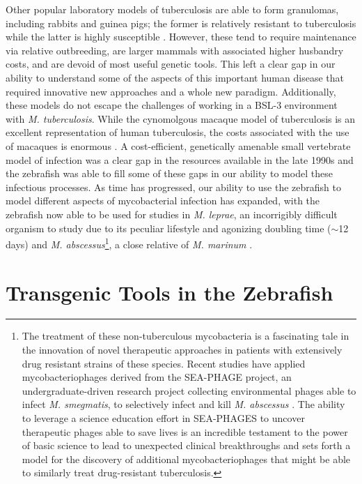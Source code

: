 Other popular laboratory models of tuberculosis are able to form granulomas, including rabbits and guinea pigs; the former is relatively resistant to tuberculosis while the latter is highly susceptible \citep{Heppleston1949, Dorman2004, Clark2014}. However, these tend to require maintenance via relative outbreeding, are larger mammals with associated higher husbandry costs, and are devoid of most useful genetic tools. This left a clear gap in our ability to understand some of the aspects of this important human disease that required innovative new approaches and a whole new paradigm. Additionally, these models do not escape the challenges of working in a BSL\hyp{}3 environment with \textit{M. tuberculosis}. While the cynomolgous macaque model of tuberculosis is an excellent representation of human tuberculosis, the costs associated with the use of macaques is enormous \citep{Pena2015}. A cost\hyp{}efficient, genetically amenable small vertebrate model of infection was a clear gap in the resources available in the late 1990s and the zebrafish was able to fill some of these gaps in our ability to model these infectious processes. As time has progressed, our ability to use the zebrafish to model different aspects of mycobacterial infection has expanded, with the zebrafish now able to be used for studies in \textit{M. leprae}, an incorrigibly difficult organism to study due to its peculiar lifestyle and agonizing doubling time ($\sim$12 days) \citep{Madigan2017} and \textit{M. abscessus}\footnote{The treatment of these non\hyp{}tuberculous mycobacteria is a fascinating tale in the innovation of novel therapeutic approaches in patients with extensively drug resistant strains of these species. Recent studies have applied mycobacteriophages derived from the SEA\hyp{}PHAGE project, an undergraduate\hyp{}driven research project collecting environmental phages able to infect \textit{M. smegmatis}, to selectively infect and kill \textit{M. abscessus} \citep{Jordan2014, Dedrick2019, Dedrick2021, Dedrick2022}. The ability to leverage a science education effort in SEA\hyp{}PHAGES to uncover therapeutic phages able to save lives is an incredible testament to the power of basic science to lead to unexpected clinical breakthroughs and sets forth a model for the discovery of additional mycobacteriophages that might be able to similarly treat drug\hyp{}resistant tuberculosis.}, a close relative of \textit{M. marinum} \citep{Stinear2008, Halloum2016, Bryant2016}.

\section{Transgenic Tools in the Zebrafish}\label{transgenics}

